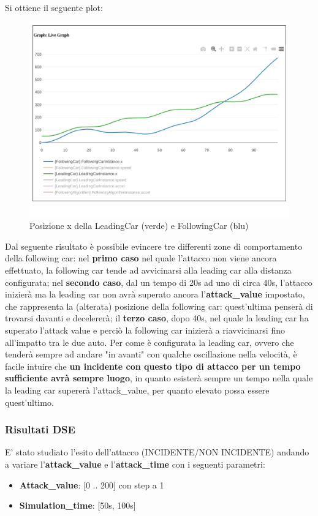 Si ottiene il seguente plot:
\begin{figure}[H]
	\centering
	\includegraphics[width=\textwidth]{img/AttackXSimulation.png}
	\caption{Posizione x della LeadingCar (verde) e FollowingCar (blu)}
\end{figure}
Dal seguente risultato è possibile evincere tre differenti zone di comportamento della following car: nel \textbf{primo caso} nel quale l'attacco non viene ancora effettuato, la following car tende ad avvicinarsi alla leading car alla distanza configurata; nel \textbf{secondo caso}, dal un tempo di 20s ad uno di circa 40s, l'attacco inizierà ma la leading car non avrà superato ancora l'\textbf{attack\_value} impostato, che rappresenta la (alterata) posizione della following car: quest'ultima penserà di trovarsi davanti e decelererà; il \textbf{terzo caso}, dopo 40s, nel quale la leading car ha superato l'attack value e perciò la following car inizierà a riavvicinarsi fino all'impatto tra le due auto.
Per come è configurata la leading car, ovvero che tenderà sempre ad andare "in avanti" con qualche oscillazione nella velocità, è facile intuire che \textbf{un incidente con questo tipo di attacco per un tempo sufficiente avrà sempre luogo}, in quanto esisterà sempre un tempo nella quale la leading car supererà l'attack\_value, per quanto elevato possa essere quest'ultimo.  
\subsubsection{Risultati DSE}
E' stato studiato l'esito dell'attacco (INCIDENTE/NON INCIDENTE) andando a variare l'\textbf{attack\_value} e l'\textbf{attack\_time} con i seguenti parametri:
\begin{itemize}
	\item \textbf{Attack\_value}: [0 .. 200] con step a 1
	\item \textbf{Simulation\_time}: [50s, 100s]
\end{itemize}
 
